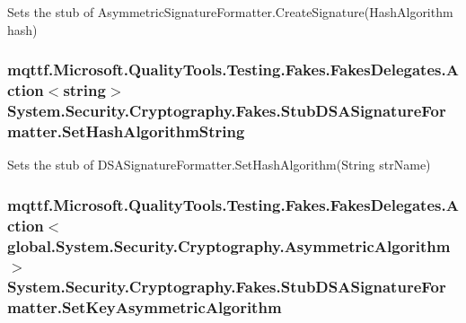 Sets the stub of Asymmetric\-Signature\-Formatter.\-Create\-Signature(\-Hash\-Algorithm hash)

\hypertarget{class_system_1_1_security_1_1_cryptography_1_1_fakes_1_1_stub_d_s_a_signature_formatter_a043ab12eb86ee36e04d58dd01e7d02b6}{
\subsubsection[{Set\-Hash\-Algorithm\-String}]{\setlength{\rightskip}{0pt plus 5cm}mqttf.\-Microsoft.\-Quality\-Tools.\-Testing.\-Fakes.\-Fakes\-Delegates.\-Action$<$string$>$ System.\-Security.\-Cryptography.\-Fakes.\-Stub\-D\-S\-A\-Signature\-Formatter.\-Set\-Hash\-Algorithm\-String}}\label{class_system_1_1_security_1_1_cryptography_1_1_fakes_1_1_stub_d_s_a_signature_formatter_a043ab12eb86ee36e04d58dd01e7d02b6}


Sets the stub of D\-S\-A\-Signature\-Formatter.\-Set\-Hash\-Algorithm(\-String str\-Name)

\hypertarget{class_system_1_1_security_1_1_cryptography_1_1_fakes_1_1_stub_d_s_a_signature_formatter_a8317eecdfa411e03aa20a329624d6a6f}{
\subsubsection[{Set\-Key\-Asymmetric\-Algorithm}]{\setlength{\rightskip}{0pt plus 5cm}mqttf.\-Microsoft.\-Quality\-Tools.\-Testing.\-Fakes.\-Fakes\-Delegates.\-Action$<$global.\-System.\-Security.\-Cryptography.\-Asymmetric\-Algorithm$>$ System.\-Security.\-Cryptography.\-Fakes.\-Stub\-D\-S\-A\-Signature\-Formatter.\-Set\-Key\-Asymmetric\-Algorithm}}\label{class_system_1_1_security_1_1_cryptography_1_1_fakes_1_1_stub_d_s_a_signature_formatter_a8317eecdfa411e03aa20a329624d6a6f}


